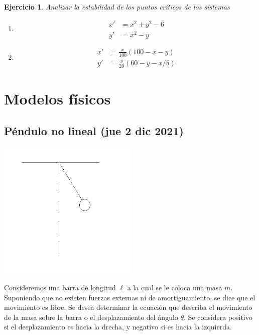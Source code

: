 \documentclass[11pt,letterpaper,draft]{report}
\newtheorem{exe}{Ejercicio}
\newcommand\<{\langle}
\renewcommand\>{\rangle}
\begin{document}
\begin{exe}
  Analizar la estabilidad de los puntos críticos de los sistemas
  \begin{enumerate}
    \item
    \begin{align*}
      x' &= x^2+y^2-6 \\
      y' &= x^2-y
    \end{align*}
    
    \item
    \begin{align*}
      x' &= \frac{x}{100}(100-x-y) \\
      y' &= \frac{y}{20}(60-y-x/5)
    \end{align*}
  \end{enumerate}
\end{exe}

\chapter{Modelos físicos}

\section{Péndulo no lineal (jue 2 dic 2021)}


\begin{center}
\includegraphics[width=0.5\textwidth]{img/pendulo-no-lineal}
\end{center}

Consideremos una barra de longitud $\ell$ a la cual se le coloca una
masa $m$. Suponiendo que no existen fuerzas externas ni de
amortiguamiento, se dice que el movimiento es libre.
Se desea determinar la ecuación que describa el movimiento de la masa
sobre la barra o el desplazamiento del ángulo $\theta$. Se considera
positivo si el desplazamiento es hacia la drecha, y negativo si es
hacia la izquierda.
\end{document}
